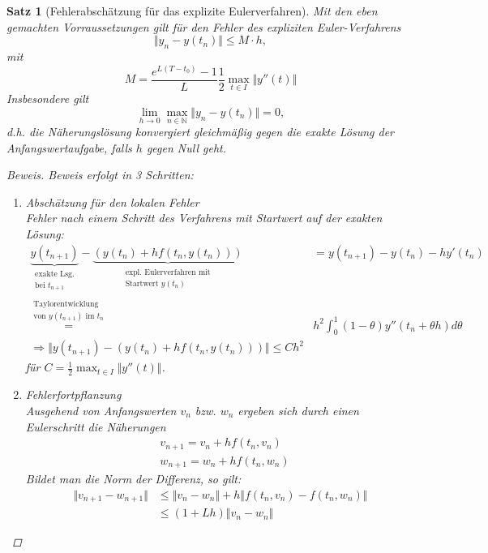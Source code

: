 \documentclass[12pt]{article}
\theoremstyle{break}
\newtheorem{theorem}{Satz}[subsection]
\begin{document}
\begin{theorem}[Fehlerabschätzung für das explizite Eulerverfahren]
Mit den eben gemachten Vorraussetzungen gilt für den Fehler des expliziten Euler-Verfahrens
$$\Vert y_n - y(t_n) \Vert \leq M \cdot h,$$
mit
$$ M = \frac{e^{L(T-t_0)} - 1}{L} \frac{1}{2} \max_{t \in I} \Vert y''(t) \Vert $$
Insbesondere gilt
$$\lim_{h \rightarrow 0} \max_{n \in \mathbb{N}} \Vert y_n - y(t_n) \Vert = 0,$$
d.h. die Näherungslösung konvergiert gleichmäßig gegen die exakte Lösung der Anfangswertaufgabe, falls $h$ gegen Null geht.

\begin{proof}[Beweis]\leavevmode
Beweis erfolgt in 3 Schritten:
\renewcommand{\labelenumi}{\theenumi)}
\begin{enumerate}
  \item Abschätzung für den lokalen Fehler\\
  Fehler nach einem Schritt des Verfahrens mit Startwert auf der exakten Lösung:
  \begin{align*}
  \underbrace{y(t_{n+1})}_{\substack{\text{exakte Lsg.}\\ \text{bei $t_{n+1}$}}} - 
  \underbrace{(y(t_n) + hf(t_n, y(t_n)))}_{\substack{\text{expl. Eulerverfahren mit} \\ \text{Startwert $y(t_n)$}}} &= y(t_{n+1}) - y(t_n) - hy'(t_n) \\
  \overset{\substack{\text{Taylorentwicklung}\\\text{von $y(t_{n+1})$ im $t_n$}}}{=}& h^2 \int_0^1 (1- \theta) y'' (t_n + \theta h) d\theta \\
  \Rightarrow  \Vert y(t_{n+1}) - (y(t_n) + hf(t_n, y(t_n))) \Vert \leq Ch^2
  \end{align*}
  für $C = \frac{1}{2} \max_{t \in I} \Vert y''(t) \Vert$.
  \item Fehlerfortpflanzung\\
  Ausgehend von Anfangswerten $v_n$ bzw. $w_n$ ergeben sich durch einen Eulerschritt die Näherungen
  \begin{align*}
  & v_{n+1} = v_n + hf(t_n, v_n) \\
  & w_{n+1} = w_n + hf(t_n, w_n)
  \end{align*}
  Bildet man die Norm der Differenz, so gilt:
  \begin{align*}
  \Vert v_{n+1} - w_{n+1} \Vert &\leq \Vert v_n - w_n \Vert + h \Vert f(t_n, v_n) - f(t_n, w_n) \Vert \\
  & \leq (1+Lh) \Vert v_n - w_n \Vert
  \end{align*}

\end{enumerate}
\end{proof}
\end{theorem}
\end{document}

